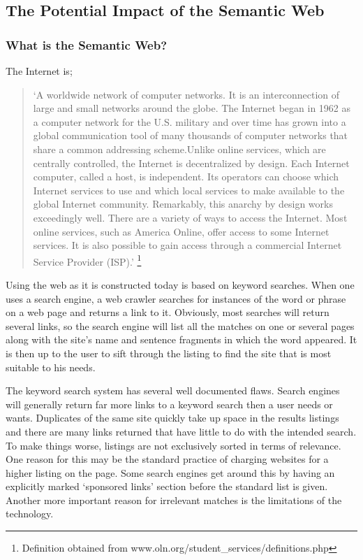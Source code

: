 \documentclass{ucthesis}
\begin{document}
\subsection{The Potential Impact of the Semantic Web}

\subsubsection{What is the Semantic Web?}

The Internet is;

\begin{quotation}
`A worldwide network of computer networks. It is an interconnection of large
and small networks around the globe. The Internet began in 1962 as a
computer network for the U.S. military and over time has grown into a global
communication tool of many thousands of computer networks that share a
common addressing scheme.Unlike online services, which are centrally
controlled, the Internet is decentralized by design. Each Internet computer,
called a host, is independent. Its operators can choose which Internet
services to use and which local services to make available to the global
Internet community. Remarkably, this anarchy by design works exceedingly
well. There are a variety of ways to access the Internet. Most online
services, such as America Online, offer access to some Internet services. It
is also possible to gain access through a commercial Internet Service
Provider (ISP).' \footnote{%
Definition obtained from www.oln.org/student\_services/definitions.php}
\end{quotation}

Using the web as it is constructed today is based on keyword searches. When
one uses a search engine, a web crawler searches for instances of the word
or phrase on a web page and returns a link to it. Obviously, most searches
will return several links, so the search engine will list all the matches on
one or several pages along with the site's name and sentence fragments in
which the word appeared. It is then up to the user to sift through the
listing to find the site that is most suitable to his needs.

The keyword search system has several well documented flaws. Search engines
will generally return far more links to a keyword search then a user needs
or wants. Duplicates of the same site quickly take up space in the results
listings and there are many links returned that have little to do with the
intended search. To make things worse, listings are not exclusively sorted
in terms of relevance. One reason for this may be the standard practice of
charging websites for a higher listing on the page. Some search engines get
around this by having an explicitly marked `sponsored links' section before
the standard list is given. Another more important reason for irrelevant
matches is the limitations of the technology.
\end{document}
